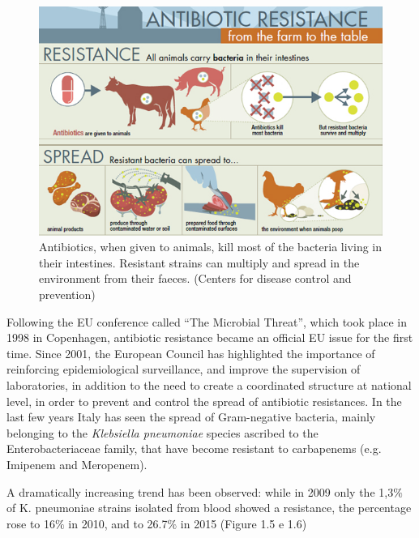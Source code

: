 \documentclass[11pt]{report}
\begin{document}
\begin{figure}[htp]
\centering
\includegraphics[scale=0.57]{immagini gamalero/Agricultural_Spread.jpg}
\caption{Antibiotics, when given to animals, kill most of the bacteria living in their intestines. Resistant strains can multiply and spread in the environment from their faeces. (Centers for disease control and prevention)}
\label{}
\end{figure}

\clearpage
Following the EU conference called “The Microbial Threat”, which took place in 1998 in Copenhagen, antibiotic resistance became an official EU issue for the first time.
Since 2001, the European Council has highlighted the importance of reinforcing epidemiological surveillance, and improve the supervision of laboratories, in addition to the need to create a coordinated structure at national level, in order to prevent and control the spread of antibiotic resistances.
In the last few years Italy has seen the spread of Gram-negative bacteria, mainly belonging to the \emph{Klebsiella pneumoniae} species ascribed to the Enterobacteriaceae family, that have become resistant to carbapenems (e.g. Imipenem and Meropenem).

A dramatically increasing trend has been observed: while in 2009 only the 1,3$\%$ of K. pneumoniae strains isolated from blood showed a resistance, the percentage rose to 16$\%$ in 2010, and to 26.7$\%$ in 2015 (Figure 1.5 e 1.6)
\end{document}
